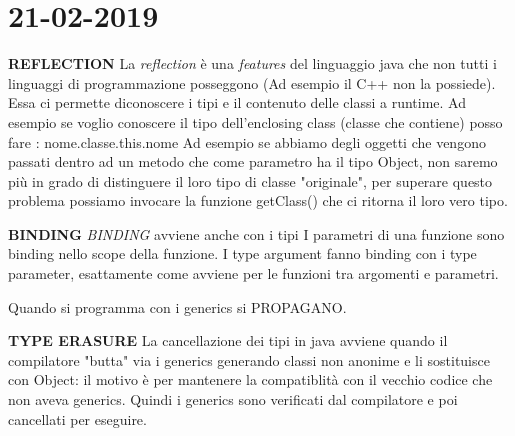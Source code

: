 

\newpage
\section{21-02-2019}
\textbf{REFLECTION} \newline
La \textit{reflection} è una \textit{features} del linguaggio java che non tutti i linguaggi di programmazione posseggono (Ad esempio il C++ non la possiede). Essa ci permette diconoscere i tipi e il contenuto delle classi  a runtime. Ad esempio se voglio conoscere il tipo dell'enclosing class (classe che contiene) posso fare : nome.classe.this.nome  \newline
Ad esempio se abbiamo degli oggetti che vengono passati dentro ad un metodo che come parametro ha il tipo Object, non saremo più in grado di distinguere il loro tipo di classe "originale", per superare questo problema possiamo invocare la funzione getClass() che ci ritorna il loro vero tipo.

\noindent \textbf{BINDING} \newline
\textit{BINDING} avviene anche con i tipi \newline
I parametri di una funzione sono binding nello scope della funzione.\newline
I type argument fanno binding con i type parameter, esattamente come avviene per le funzioni tra argomenti e parametri. \newline

Quando si programma con i generics si PROPAGANO. 

\noindent \textbf{TYPE ERASURE} \newline
La cancellazione dei tipi in java avviene quando il compilatore "butta" via i generics generando classi non anonime e li sostituisce con Object: il motivo è per mantenere la compatiblità con il vecchio codice che non aveva generics. Quindi i generics sono verificati dal compilatore e poi cancellati per eseguire.














